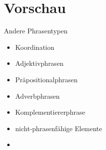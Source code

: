 \section{Vorschau}

\begin{frame}
  {Andere Phrasentypen}
  \onslide<+->
  \begin{itemize}[<+->]
    \item Koordination
    \item Adjektivphrasen
    \item Präpositionalphrasen
    \item Adverbphrasen
    \item Komplementiererphrase
    \item nicht-phrasenfähige Elemente
      \Zeile
    \item \citet[12.2,12.4--12.7]{Schaefer2018b}
  \end{itemize}
\end{frame}
